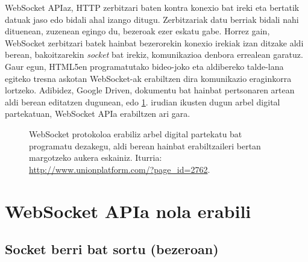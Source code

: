 WebSocket APIaz, HTTP zerbitzari baten kontra konexio bat ireki eta bertatik datuak jaso edo bidali ahal izango ditugu.  Zerbitzariak datu berriak bidali nahi dituenean, zuzenean egingo du, bezeroak ezer eskatu gabe. Horrez gain, WebSocket zerbitzari batek hainbat bezerorekin konexio irekiak izan ditzake aldi berean, bakoitzarekin \textit{socket} bat irekiz, komunikazioa denbora errealean garatuz. Gaur egun, HTML5en programatutako bideo-joko eta aldibereko talde-lana egiteko tresna askotan WebSocket-ak erabiltzen dira komunikazio eraginkorra lortzeko. Adibidez, Google Driven, dokumentu bat hainbat pertsonaren artean aldi berean editatzen dugunean, edo \ref{fig:whiteboard}. irudian ikusten dugun arbel digital partekatuan, WebSocket APIa erabiltzen ari gara.
 
 
\begin{figure}[ht]
	\centering
{}
\caption{WebSocket protokoloa erabiliz arbel digital partekatu bat programatu dezakegu, aldi berean hainbat erabiltzaileri bertan margotzeko aukera eskainiz. Iturria: \href{http://www.unionplatform.com/?page\_id=2762}{http://www.unionplatform.com/?page\_id=2762}.}
\label{fig:whiteboard}
\end{figure}


\section{WebSocket APIa nola erabili}

\subsection{Socket berri bat sortu (bezeroan)}

